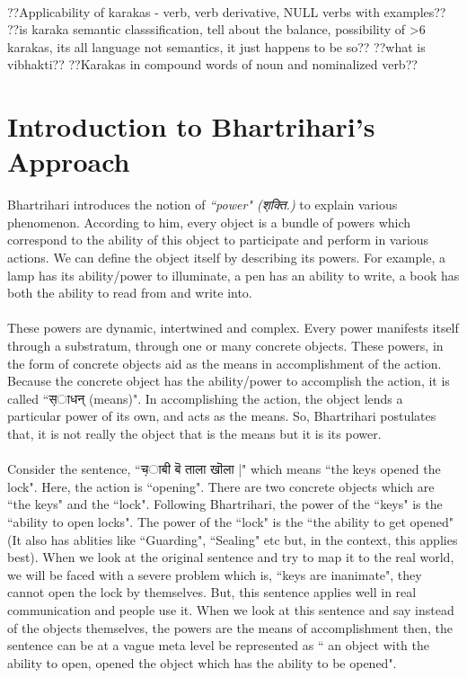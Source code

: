 \documentclass[a4paper,10pt]{article}
\begin{document}
\paragraph{}
??Applicability of karakas - verb, verb derivative, NULL verbs with examples??
??is karaka semantic classsification, tell about the balance, possibility of >6 karakas, its all language not semantics, it just happens to be so??
??what is vibhakti??
??Karakas in compound words of noun and nominalized verb??
\newpage
\section{Introduction to Bhartrihari's Approach}

Bhartrihari introduces the notion of \textit{``power" ({\d शक्ति.})} to explain various phenomenon. 
According to him, every object is a bundle of powers which correspond to the ability of this object to participate and perform in various actions. 
We can define the object itself by describing its powers. For example, a lamp has its ability/power to illuminate, a pen has an ability to write,
a book has both the ability to read from and write into.

\paragraph{} These powers are dynamic, intertwined and complex. Every power manifests itself through a substratum, through one or many concrete objects. 
These powers, in the form of concrete objects aid as the means in accomplishment of the action. Because the concrete object has the ability/power 
to accomplish the action, it is called ``{\d साधन्} (means)".
In accomplishing the action, the object lends a particular power of its own, and acts as the means. So, Bhartrihari postulates that, it is not really the object that is the means but it is its power.

\paragraph{} Consider the sentence, ``{\d चाबी बॆ ताला खॊला }|" which means ``the keys opened the lock". Here, the action is ``opening". 
There are two concrete objects which are ``the keys" and the ``lock". Following Bhartrihari, the power of the ``keys" is the ``ability to open locks". 
The power of the ``lock" is the ``the ability to get opened" (It also has ablities like ``Guarding", ``Sealing" etc but, in the context, this applies best). 
When we look at the original sentence and try to map it to the real world, we will be faced with a severe problem which is, ``keys are inanimate", 
they cannot open the lock by themselves. But, this sentence applies well in real communication and people use it. When we look at this sentence and say 
instead of the objects themselves, the powers are the means of accomplishment then, the sentence can be at a vague meta level be represented as 
`` an object with the ability to open, opened the object which has the ability to be opened". 
\end{document}
